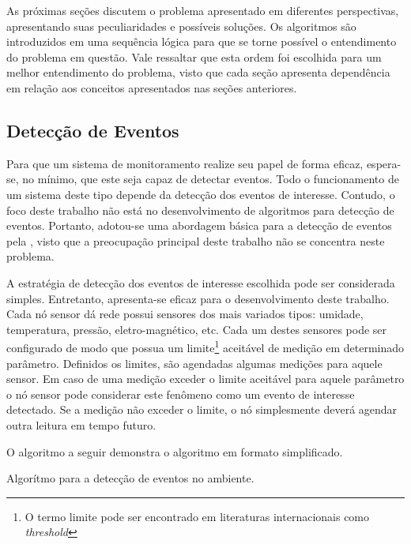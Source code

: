 As próximas seções discutem o problema apresentado em diferentes perspectivas, apresentando suas peculiaridades e possíveis
soluções. Os algoritmos são introduzidos em uma sequência lógica para que se torne possível o entendimento do problema em questão. Vale 
ressaltar que esta ordem foi escolhida para um melhor entendimento do problema, visto que cada seção apresenta dependência em relação aos conceitos
apresentados nas seções anteriores. 

\subsection{Detecção de Eventos}
Para que um sistema de monitoramento realize seu papel de forma eficaz, espera-se, no mínimo, que este seja capaz de detectar eventos. Todo o funcionamento
de um sistema deste tipo depende da detecção dos eventos de interesse. Contudo, o foco deste trabalho não está no desenvolvimento de algoritmos para 
detecção de eventos. Portanto, adotou-se uma abordagem básica para a detecção de eventos pela \rssf, visto que a preocupação principal deste trabalho não se concentra neste problema.

A estratégia de detecção dos eventos de interesse escolhida pode ser considerada simples. Entretanto, apresenta-se eficaz para o desenvolvimento deste trabalho.
Cada nó sensor dá rede possui sensores dos mais variados tipos: umidade, temperatura, pressão, eletro-magnético, etc. Cada um destes sensores pode ser
configurado de modo que possua um limite\footnote{O termo limite pode ser encontrado em literaturas internacionais como \emph{threshold}} aceitável de medição em determinado parâmetro. Definidos os limites, são agendadas algumas medições para aquele sensor. Em caso de uma medição exceder o limite aceitável
para aquele parâmetro o nó sensor pode considerar este fenômeno como um evento de interesse detectado. Se a medição não exceder o limite, o nó simplesmente
deverá agendar outra leitura em tempo futuro.

O algoritmo a seguir demonstra o algoritmo em formato simplificado. \\

\begin{algorithm}[H]
	\SetAlgoLined
	

	
\caption{Algorítmo para a detecção de eventos no ambiente.}
\end{algorithm}


